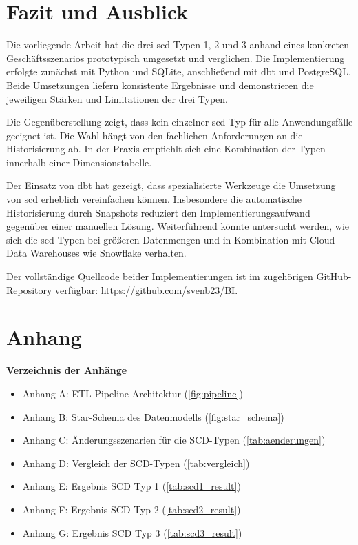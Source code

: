 \documentclass[a4paper,11pt]{article}
\begin{document}
\section{Fazit und Ausblick}
Die vorliegende Arbeit hat die drei \gls{scd}-Typen 1, 2 und 3 anhand eines konkreten Geschäftsszenarios prototypisch 
umgesetzt und verglichen. Die Implementierung erfolgte zunächst mit Python und SQLite, anschließend mit dbt und PostgreSQL. 
Beide Umsetzungen liefern konsistente Ergebnisse und demonstrieren die jeweiligen Stärken und Limitationen der drei Typen.

Die Gegenüberstellung zeigt, dass kein einzelner \gls{scd}-Typ für alle Anwendungsfälle geeignet ist. Die Wahl hängt 
von den fachlichen Anforderungen an die Historisierung ab. In der Praxis empfiehlt sich eine Kombination der Typen innerhalb einer Dimensionstabelle.

Der Einsatz von dbt hat gezeigt, dass spezialisierte Werkzeuge die Umsetzung von \gls{scd} erheblich vereinfachen können. 
Insbesondere die automatische Historisierung durch Snapshots reduziert den Implementierungsaufwand gegenüber einer 
manuellen Lösung. Weiterführend könnte untersucht werden, wie sich die \gls{scd}-Typen bei größeren Datenmengen und in 
Kombination mit Cloud Data Warehouses wie Snowflake verhalten.

Der vollständige Quellcode beider Implementierungen ist im zugehörigen GitHub-Repository verfügbar: \url{https://github.com/svenb23/BI}.

\newpage
\printbibliography[title=Literaturverzeichnis]

\newpage
\appendix
\section*{Anhang}

\textbf{Verzeichnis der Anhänge}
\begin{itemize}
    \item Anhang A: ETL-Pipeline-Architektur (\cref{fig:pipeline})
    \item Anhang B: Star-Schema des Datenmodells (\cref{fig:star_schema})
    \item Anhang C: Änderungsszenarien für die SCD-Typen (\cref{tab:aenderungen})
    \item Anhang D: Vergleich der SCD-Typen (\cref{tab:vergleich})
    \item Anhang E: Ergebnis SCD Typ 1 (\cref{tab:scd1_result})
    \item Anhang F: Ergebnis SCD Typ 2 (\cref{tab:scd2_result})
    \item Anhang G: Ergebnis SCD Typ 3 (\cref{tab:scd3_result})
\end{itemize}
\newpage
\end{document}
